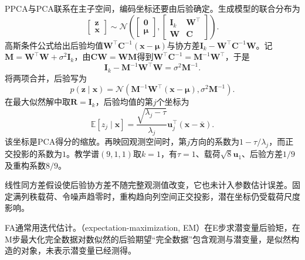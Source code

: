 PPCA与PCA联系在主子空间，编码坐标还要由后验确定。生成模型的联合分布为
\begin{equation}
\label{eq:dim-ppca-joint}
\begin{bmatrix}\bm{z}\\ \bm{x}\end{bmatrix}
\sim\mathcal{N}\left(
\begin{bmatrix}\bm{0}\\ \bm{\mu}\end{bmatrix},
\begin{bmatrix}
\bm{I}_k&\bm{W}^\top\\
\bm{W}&\bm{C}
\end{bmatrix}\right).
\end{equation}
高斯条件公式给出后验均值$\bm{W}^\top\bm{C}^{-1}(\bm{x}-\bm{\mu})$与协方差$\bm{I}_k-\bm{W}^\top\bm{C}^{-1}\bm{W}$。记$\bm{M}=\bm{W}^\top\bm{W}+\sigma^2\bm{I}_k$，由$\bm{C}\bm{W}=\bm{W}\bm{M}$得到$\bm{W}^\top\bm{C}^{-1}=\bm{M}^{-1}\bm{W}^\top$，于是
\[
\bm{I}_k-\bm{M}^{-1}\bm{W}^\top\bm{W}
=\sigma^2\bm{M}^{-1}.
\]
将两项合并，后验写为
\begin{equation}
\label{eq:dim-ppca-posterior}
p(\bm{z}\mid\bm{x})
=\mathcal{N}\left(
\bm{M}^{-1}\bm{W}^\top(\bm{x}-\bm{\mu}),
\sigma^2\bm{M}^{-1}\right).
\end{equation}
在最大似然解中取$\bm{R}=\bm{I}_k$，后验均值的第$j$个坐标为
\begin{equation}
\label{eq:dim-ppca-score}
\mathbb{E}[z_j\mid\bm{x}]
=\frac{\sqrt{\lambda_j-\tau}}{\lambda_j}
\bm{u}_j^\top(\bm{x}-\bar{\bm{x}}).
\end{equation}
该坐标是PCA得分的缩放。再映回观测空间时，第$j$方向的系数为$1-\tau/\lambda_j$，而正交投影的系数为$1$。教学谱$(9,1,1)$取$k=1$，有$\tau=1$、载荷$\sqrt8\bm{u}_1$、后验方差$1/9$及重构系数$8/9$。

线性同方差假设使后验协方差不随完整观测值改变，它也未计入参数估计误差。固定满列秩载荷、令噪声趋零时，重构趋向列空间正交投影，潜在坐标仍受载荷尺度影响。

FA通常用迭代估计。（expectation-maximization, EM）在E步求潜变量后验矩，在M步最大化完全数据对数似然的后验期望“完全数据”包含观测与潜变量，是似然构造的对象，未表示潜变量已经测得。

